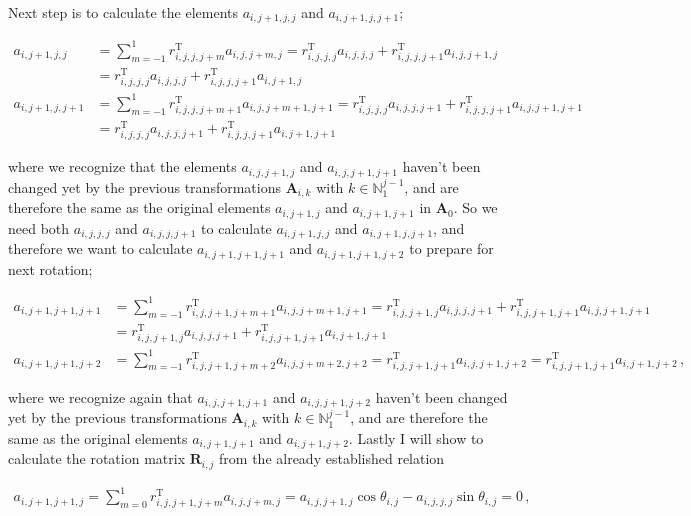 \documentclass[11pt,english,a4paper]{article}
\begin{document}
\begin{flushleft}
Next step is to calculate the elements $a_{i,j+1,j,j}$ and $a_{i,j+1,j,j+1}$;

\begin{align*}
a_{i,j+1,j,j} &= \sum_{m=-1}^1 r_{i,j,j,j+m}^{\text{T}} a_{i,j,j+m,j} = r_{i,j,j,j}^{\text{T}}a_{i,j,j,j} + r_{i,j,j,j+1}^{\text{T}} a_{i,j,j+1,j} 
\\
&= r_{i,j,j,j}^{\text{T}}a_{i,j,j,j} + r_{i,j,j,j+1}^{\text{T}} a_{i,j+1,j}
\\
a_{i,j+1,j,j+1} &= \sum_{m=-1}^1 r_{i,j,j,j+m+1}^{\text{T}} a_{i,j,j+m+1,j+1} = r_{i,j,j,j}^{\text{T}} a_{i,j,j,j+1} + r_{i,j,j,j+1}^{\text{T}} a_{i,j,j+1,j+1}
\\
&= r_{i,j,j,j}^{\text{T}} a_{i,j,j,j+1} + r_{i,j,j,j+1}^{\text{T}} a_{i,j+1,j+1}
\end{align*} 

where we recognize that the elements $a_{i,j,j+1,j}$ and  $a_{i,j,j+1,j+1}$ haven't been changed yet by the previous transformations $\textbf{A}_{i,k}$ with $k\in\mathbb{N}_1^{j-1}$, and are therefore the same as the original elements $a_{i,j+1,j}$ and $a_{i,j+1,j+1}$ in $\textbf{A}_0$. So we need both $a_{i,j,j,j}$ and $a_{i,j,j,j+1}$ to calculate $a_{i,j+1,j,j}$ and $a_{i,j+1,j,j+1}$, and therefore we want to calculate $a_{i,j+1,j+1,j+1}$ and $a_{i,j+1,j+1,j+2}$ to prepare for next rotation;

\begin{align*}
a_{i,j+1,j+1,j+1} &= \sum_{m=-1}^1 r_{i,j,j+1,j+m+1}^{\text{T}} a_{i,j,j+m+1,j+1} = r_{i,j,j+1,j}^{\text{T}} a_{i,j,j,j+1} + r_{i,j,j+1,j+1}^{\text{T}} a_{i,j,j+1,j+1}
\\
&= r_{i,j,j+1,j}^{\text{T}} a_{i,j,j,j+1} + r_{i,j,j+1,j+1}^{\text{T}} a_{i,j+1,j+1}
\\
a_{i,j+1,j+1,j+2}  &= \sum_{m=-1}^1 r_{i,j,j+1,j+m+2}^{\text{T}} a_{i,j,j+m+2,j+2} = r_{i,j,j+1,j+1}^{\text{T}} a_{i,j,j+1,j+2} = r_{i,j,j+1,j+1}^{\text{T}} a_{i,j+1,j+2} \,,
\end{align*}

where we recognize again that $a_{i,j,j+1,j+1}$ and $a_{i,j,j+1,j+2}$ haven't been changed yet by the previous transformations $\textbf{A}_{i,k}$ with $k\in\mathbb{N}_1^{j-1}$, and are therefore the same as the original elements $a_{i,j+1,j+1}$ and $a_{i,j+1,j+2}$. Lastly I will show to calculate the rotation matrix $\textbf{R}_{i,j}$ from the already established relation

\begin{align*}
a_{i,j+1,j+1,j} = \sum_{m=0}^1 r_{i,j,j+1,j+m}^{\text{T}} a_{i,j,j+m,j} = a_{i,j,j+1,j}\cos\theta_{i,j}-a_{i,j,j,j}\sin\theta_{i,j} = 0 \,,
\end{align*}


\end{flushleft}
\end{document}
